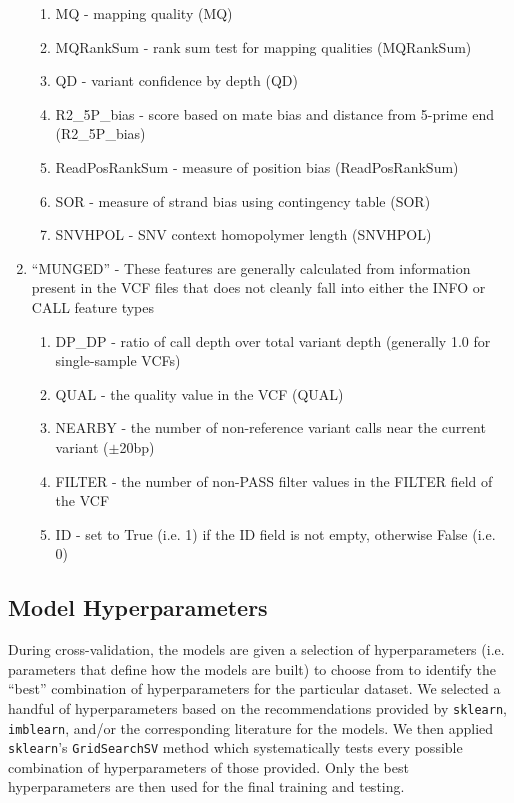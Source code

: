 \begin{enumerate}
\begin{enumerate}
        \item MQ - mapping quality (MQ)
        \item MQRankSum - rank sum test for mapping qualities (MQRankSum)
        \item QD - variant confidence by depth (QD)
        \item R2\_5P\_bias - score based on mate bias and distance from 5-prime end (R2\_5P\_bias)
        \item ReadPosRankSum - measure of position bias (ReadPosRankSum)
        \item SOR - measure of strand bias using contingency table (SOR)
        \item SNVHPOL - SNV context homopolymer length (SNVHPOL)
    \end{enumerate}
    \item ``MUNGED'' - These features are generally calculated from information present in the VCF files that does not cleanly fall into either the INFO or CALL feature types
    \begin{enumerate}
        \item DP\_DP - ratio of call depth over total variant depth (generally 1.0 for single-sample VCFs)
        \item QUAL - the quality value in the VCF (QUAL)
        \item NEARBY - the number of non-reference variant calls near the current variant ($\pm$20bp)
        \item FILTER - the number of non-PASS filter values in the FILTER field of the VCF
        \item ID - set to True (i.e. 1) if the ID field is not empty, otherwise False (i.e. 0)
    \end{enumerate}
\end{enumerate}

\subsection{Model Hyperparameters}
During cross-validation, the models are given a selection of hyperparameters (i.e. parameters that define how the models are built) to choose from to identify the ``best'' combination of hyperparameters for the particular dataset. We selected a handful of hyperparameters based on the recommendations provided by \texttt{sklearn}, \texttt{imblearn}, and/or the corresponding literature for the models.  We then applied \texttt{sklearn}'s \texttt{GridSearchSV} method which systematically tests every possible combination of hyperparameters of those provided.  Only the best hyperparameters are then used for the final training and testing.

